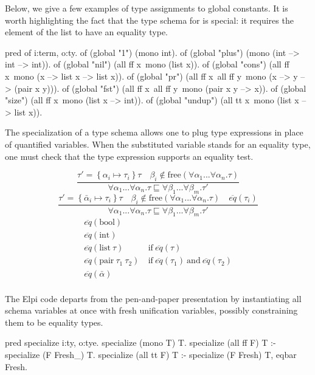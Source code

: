 \documentclass[a4paper, 11pt]{book}
\begin{document}
Below, we give a few examples of type assignments to global constants. It is
worth highlighting the fact that the type schema for  is
special: it requires the element of the list to have an equality type.

\begin{elpicode}
pred of i:term, o:ty.
of (global "1")      (mono int).
of (global "plus")   (mono (int --> int --> int)).
of (global "nil")    (all ff x\ mono (list x)).
of (global "cons")   (all ff x\ mono (x --> list x --> list x)).
of (global "pr")     (all ff x\ all ff y\ mono (x --> y --> (pair x y))).
of (global "fst")    (all ff x\ all ff y\ mono (pair x y --> x)).
of (global "size")   (all ff x\ mono (list x --> int)).
of (global "undup")  (all tt x\ mono (list x --> list x)).
\end{elpicode}
\noindent
The specialization of a type schema allows one to plug type expressions in
place of quantified variables. When the substituted variable stands for an
equality type, one must check that the type expression supports an equality
test.

$$
\displaystyle\frac{\tau' = \left\{\alpha_i \mapsto \tau_i\right\} \tau \quad \beta_i \not\in \textrm{free}(\forall \alpha_1...\forall\alpha_n . \tau)}{\forall \alpha_1...\forall\alpha_n . \tau \sqsubseteq \forall \beta_1...\forall\beta_m . \tau'}
$$
$$
\displaystyle\frac{\tau' = \left\{\bar\alpha_i \mapsto \tau_i\right\} \tau \quad \beta_i \not\in \textrm{free}(\forall \alpha_1...\forall\alpha_n . \tau) \quad \overline{eq}(\tau_i)}{\forall \alpha_1...\forall\alpha_n . \tau \sqsubseteq \forall \beta_1...\forall\beta_m . \tau'}
$$
$$
\begin{array}{ll}
  \overline{eq}(\mbox{bool}) & \\
  \overline{eq}(\mbox{int}) & \\
  \overline{eq}(\mbox{list}~\tau) & ~\mbox{if}~ \overline{eq}(\tau) \\
  \overline{eq}(\mbox{pair}~\tau_1~\tau_2) & ~\mbox{if}~ \overline{eq}(\tau_1) ~\mbox{and}~ \overline{eq}(\tau_2)\\
  \overline{eq}(\bar\alpha) & \\
\end{array}
$$

The Elpi code departs from the pen-and-paper presentation by instantiating all
schema variables at once with fresh unification variables, possibly
constraining them to be equality types.

\begin{elpicode}
pred specialize i:ty, o:tye.
specialize (mono T) T.
specialize (all ff F) T :- specialize (F Fresh_) T.
specialize (all tt F) T :- specialize (F Fresh) T, eqbar Fresh.
\end{elpicode}
\end{document}
